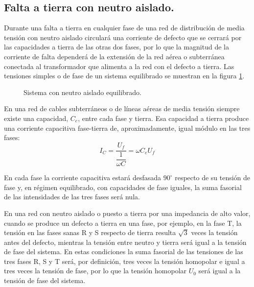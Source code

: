         \subsection{Falta a tierra con neutro aislado.}
            Durante una falta a tierra en cualquier fase de una red de distribución de media tensión con neutro aislado circulará una corriente de defecto que se cerrará por las capacidades a tierra de las otras dos fases, por lo que la magnitud de la corriente de falta dependerá de la extensión de la red aérea o subterránea conectada al transformador que alimenta a la red con el defecto a tierra. Las tensiones simples o de fase de un sistema equilibrado se muestran en la figura \ref{fig:aisladoSinFalta}.
            \begin{figure}[H]
                \centering
                \caption{Sistema con neutro aislado equilibrado.}
                \label{fig:aisladoSinFalta}
            \end{figure}

            En una red de cables subterráneos o de líneas aéreas de media tensión siempre existe una capacidad, $C_\textit{e}$, entre cada fase y tierra. Esa capacidad a tierra produce una corriente capacitiva fase-tierra de, aproximadamente, igual módulo en las tres fases:
            \begin{equation}
                I_\textit{C} = \dfrac{U_\textit{f}}{\dfrac{1}{\omega C}} = \omega C_\textit{e}U_\textit{f}
            \end{equation}

            En cada fase la corriente capacitiva estará desfasada $90^\circ$ respecto de su tensión de fase y, en régimen equilibrado, con capacidades de fase iguales, la suma fasorial de las intensidades de las tres fases será nula.\newline

            En una red con neutro aislado o puesto a tierra por una impedancia de alto valor, cuando se produce un defecto a tierra en una fase, por ejemplo, en la fase T, la tensión en las fases sanas R y S respecto de tierra resulta $\sqrt{3}$ veces la tensión antes del defecto, mientras la tensión entre neutro y tierra será igual a la tensión de fase del sistema. En estas condiciones la suma fasorial de las tensiones de las tres fases R, S y T será, por definición, tres veces la tensión homopolar e igual a tres veces la tensión de fase, por lo que la tensión homopolar $U_0$ será igual a la tensión de fase del sistema.

